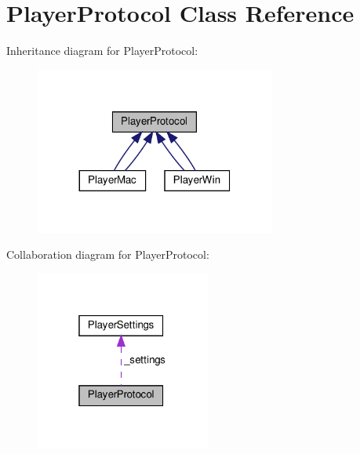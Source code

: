 \hypertarget{classPlayerProtocol}{}\section{Player\+Protocol Class Reference}
\label{classPlayerProtocol}


Inheritance diagram for Player\+Protocol\+:
\nopagebreak
\begin{figure}[H]
\begin{center}
\leavevmode
\includegraphics[width=224pt]{classPlayerProtocol__inherit__graph}
\end{center}
\end{figure}


Collaboration diagram for Player\+Protocol\+:
\nopagebreak
\begin{figure}[H]
\begin{center}
\leavevmode
\includegraphics[width=163pt]{classPlayerProtocol__coll__graph}
\end{center}
\end{figure}
